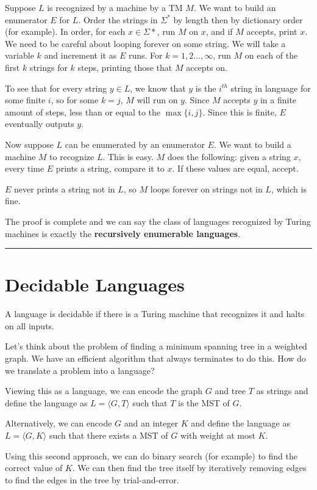 \documentclass[twoside]{article}
\newenvironment{proof}{{\bf Proof:}}{\hfill\rule{2mm}{2mm}}
\begin{document}
\begin{proof}
	
	Suppose $L$ is recognized by a machine by a TM $M$.  We want to build an enumerator $E$ for $L$.  Order the strings in $\Sigma^*$ by length then by dictionary order (for example).  In order, for each $x\in\Sigma*$, run $M$ on $x$, and if $M$ accepts, print $x$.  We need to be careful about looping forever on some string.  We will take a variable $k$ and increment it as $E$ runs.  For $k=1,2\dots,\infty$, run $M$ on each of the first $k$ strings for $k$ steps, printing those that $M$ accepts on.
	
	To see that for every string $y\in L$, we know that $y$ is the $i^{th}$ string in language for some finite $i$, so for some $k = j$, $M$ will run on $y$.  Since $M$ accepts $y$ in a finite amount of steps, less than or equal to the $\max\{i,j\}$.  Since this is finite, $E$ eventually outputs $y$.
	
	Now suppose $L$ can be enumerated by an enumerator $E$.  We want to build a machine $M$ to recognize $L$.  This is easy.  $M$ does the following: given a string $x$, every time $E$ prints a string, compare it to $x$.  If these values are equal, accept.  
	
	$E$ never prints a string not in $L$, so $M$ loops forever on strings not in $L$, which is fine.
	
	The proof is complete and we can say the class of languages recognized by Turing machines is exactly the \textbf{recursively enumerable languages}.
	
	
\end{proof}


\section{Decidable Languages}

A language is decidable if there is a Turing machine that recognizes it and halts on all inputs.

Let's think about the problem of finding a minimum spanning tree in a weighted graph.  We have an efficient algorithm that always terminates to do this.  How do we translate a problem into a language?

Viewing this as a language, we can encode the graph $G$ and tree $T$ as strings and define the language as $L=\langle G,T\rangle$ such that $T$ is the MST of $G$.  

Alternatively, we can encode $G$ and an integer $K$ and define the language as $L = \langle G,K\rangle$ such that there exists a MST of $G$ with weight at most $K$.

Using this second approach, we can do binary search (for example) to find the correct value of $K$.  We can then find the tree itself by iteratively removing edges to find the edges in the tree by trial-and-error.
\end{document}
